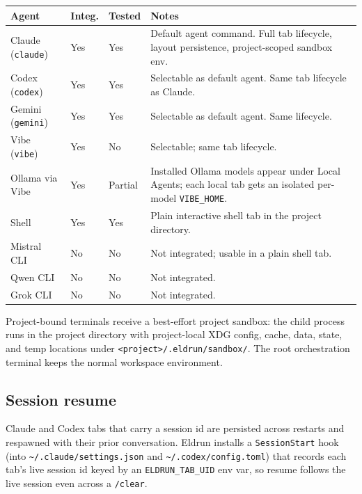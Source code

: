 \documentclass[11pt,a4paper]{article}
\newcommand{\code}[1]{\texttt{#1}}
\begin{document}
\begin{longtable}{@{}p{4.6cm}p{1.6cm}p{1.4cm}p{6.2cm}@{}}
\toprule
\textbf{Agent} & \textbf{Integ.} & \textbf{Tested} & \textbf{Notes} \\
\midrule
\endhead
Claude (\code{claude})       & Yes & Yes     & Default agent command. Full tab lifecycle, layout persistence, project-scoped sandbox env. \\
Codex (\code{codex})         & Yes & Yes     & Selectable as default agent. Same tab lifecycle as Claude. \\
Gemini (\code{gemini})       & Yes & Yes     & Selectable as default agent. Same lifecycle. \\
Vibe (\code{vibe})           & Yes & No      & Selectable; same tab lifecycle. \\
Ollama via Vibe              & Yes & Partial & Installed Ollama models appear under Local Agents; each local tab gets an isolated per-model \code{VIBE\_HOME}. \\
Shell                        & Yes & Yes     & Plain interactive shell tab in the project directory. \\
Mistral CLI                  & No  & No      & Not integrated; usable in a plain shell tab. \\
Qwen CLI                     & No  & No      & Not integrated. \\
Grok CLI                     & No  & No      & Not integrated. \\
\bottomrule
\end{longtable}

Project-bound terminals receive a best-effort project sandbox: the child process
runs in the project directory with project-local XDG config, cache, data, state,
and temp locations under \code{<project>/.eldrun/sandbox/}. The root
orchestration terminal keeps the normal workspace environment.

\subsection{Session resume}

Claude and Codex tabs that carry a session id are persisted across restarts and
respawned with their prior conversation. Eldrun installs a \code{SessionStart}
hook (into \code{\textasciitilde/.claude/settings.json} and
\code{\textasciitilde/.codex/config.toml}) that records each tab's live session
id keyed by an \code{ELDRUN\_TAB\_UID} env var, so resume follows the live
session even across a \code{/clear}.
\end{document}
